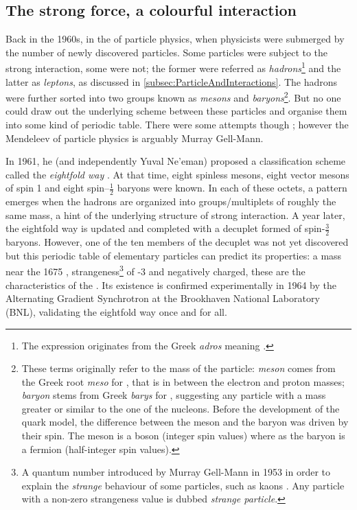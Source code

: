 \subsection{The strong force, a colourful interaction}
\label{subsec:strongforce}

Back in the 1960s, in the  of particle physics, when physicists were submerged by the number of newly discovered  particles. Some particles were subject to the strong interaction, some were not; the former were referred as \textit{hadrons}\footnote{The expression originates from the Greek \textit{adros} meaning .} and the latter as \textit{leptons}, as discussed in \Sec\ref{subsec:ParticleAndInteractions}. The hadrons were further sorted into two groups known as \textit{mesons} and \textit{baryons}\footnote{These terms originally refer to the mass of the particle: \textit{meson} comes from the Greek root \textit{meso} for , that is in between the electron and proton masses; \textit{baryon} stems from Greek \textit{barys} for , suggesting any particle with a mass greater or similar to the one of the nucleons. Before the development of the quark model, the difference between the meson and the baryon was driven by their spin. The meson is a boson (integer spin values) where as the baryon is a fermion (half-integer spin values)\cite{s.glashowInteractionsJourneyMind1990}.}. But no one could draw out the underlying scheme between these particles and organise them into some kind of periodic table. There were some attempts though \cite{sakataCompositeModelNew1956}\cite{sakuraiTheoryStrongInteractions1960}; however the Mendeleev of particle physics is arguably Murray Gell-Mann.

In 1961, he (and independently Yuval Ne'eman) proposed a classification scheme called the \textit{eightfold way} \cite{gell-mannEIGHTFOLDWAYTHEORY1961}\cite{neemanDerivationStrongInteractions1961}. At that time, eight spinless mesons, eight vector mesons of spin 1 and eight spin--$\frac{1}{2}$ baryons were known. In each of these octets, a pattern emerges when the hadrons are organized into groups/multiplets of roughly the same mass, a hint of the underlying structure of strong interaction. A year later, the eightfold way is updated and completed with a decuplet formed of spin-$\frac{3}{2}$ baryons. However, one of the ten members of the decuplet was not yet discovered but this periodic table of elementary particles can predict its properties: a mass near the 1675 \mmass, strangeness\footnote{A quantum number introduced by Murray Gell-Mann in 1953 in order to explain the \textit{strange} behaviour of some particles, such as kaons \cite{gell-mannIsotopicSpinNew1953}. Any particle with a non-zero strangeness value is dubbed \textit{strange particle}.} of -3 and negatively charged, these are the characteristics of the \rmOmegaM. Its existence is confirmed experimentally in 1964 by the Alternating Gradient Synchrotron at the Brookhaven National Laboratory (BNL)\cite{barnesObservationHyperonStrangeness1964a}, validating the eightfold way once and for all.\\

